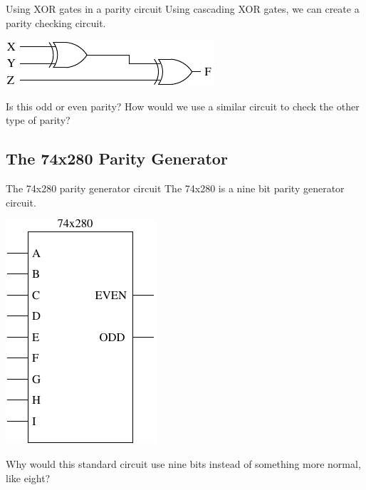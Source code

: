 \begin{frame}{Using XOR gates in a parity circuit}
  Using cascading XOR gates, we can create a parity checking circuit.\\
  \begin{center}
    \includegraphics{CascadingParityCircuit}
  \end{center}
  Is this odd or even parity?  How would we use a similar circuit to check the other type of parity?
\end{frame}

\subsection{The 74x280 Parity Generator}

\begin{frame}{The 74x280 parity generator circuit}
  The 74x280 is a nine bit parity generator circuit.\\
  \begin{center}
    \includegraphics{74x280Schematic}
  \end{center}
  Why would this standard circuit use nine bits instead of something more normal, like eight?
\end{frame}

